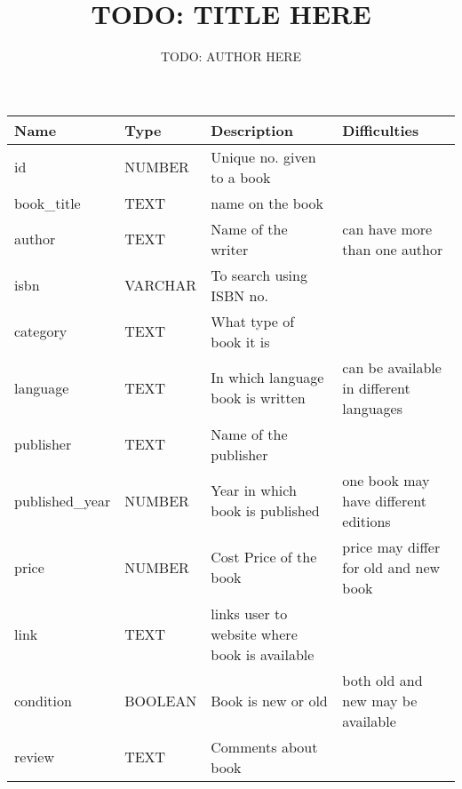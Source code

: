 \documentclass[10pt,a4paper]{article}
\title{TODO: TITLE HERE}
\author{TODO: AUTHOR HERE}
\begin{document}
\maketitle

\begin{tabularx}{\textwidth}{lllX}
\toprule
\textbf{Name} & \textbf{Type} & \textbf{Description} & \textbf{Difficulties}\\
\midrule
id & NUMBER & Unique no. given to a book & \\
book\_title & TEXT & name on the book & \\
author & TEXT & Name of the writer & can have more than one author\\
isbn & VARCHAR & To search using ISBN no. & \\
category & TEXT & What type of book it is & \\
language & TEXT & In which language book is written & can be available in different languages \\
publisher & TEXT & Name of the publisher & \\
published\_year & NUMBER & Year in which book is published & one book may have different editions\\
price & NUMBER & Cost Price of the book & price may differ for old and new book\\
link & TEXT & links user to website where book is available & \\
condition & BOOLEAN & Book is new or old & both old and new may be available \\
review & TEXT & Comments about book & \\
\bottomrule
\end{tabularx}
\end{document}
